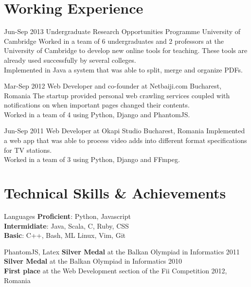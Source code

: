 \documentclass[]{friggeri-cv}
\begin{document}
\section{Working Experience}
\begin{entrylist}

  \entry
  {Jun-Sep 2013} 
  {}
  {Undergraduate Research Opportunities Programme}
  {University of Cambridge}
  {
    Worked in a team of 6 undergraduates and 2 professors at the University of Cambridge to develop new online tools
    for teaching.
    These tools are already used successfully by several colleges.\\

    Implemented in Java a system that was able to split, merge and organize PDFs.
  }

  \entry
  {Mar-Sep 2012}
  {}
  {Web Developer and co-founder at Netbaiji.com}
  {Bucharest, Romania}
  {
    The startup provided personal web crawling services coupled with notifications on when important pages changed
    their contents. \\  

    Worked in a team of 4 using Python, Django and PhantomJS.
  }

  \entry
  {Jun-Sep 2011}
  {}
  {Web Developer at Okapi Studio}
  {Bucharest, Romania}
  {
    Implemented a web app that was able to process video adds into different format specifications for TV stations. \\

    Worked in a team of 3 using Python, Django and FFmpeg.
  }

\end{entrylist}

\section{Technical Skills \& Achievements}
\begin{entrylist}
  \simpleentry
  {Languages}
  {
    \textbf{Proficient}:  Python, Javascript \\
    \textbf{Intermidiate}:  Java, Scala, C, Ruby, CSS \\
    \textbf{Basic}:  C++, Bash, ML
  }
   {
    Linux, Vim, Git
  }

   {
    PhantomJS, Latex
  }
   {
    \textbf{Silver Medal} at the Balkan Olympiad in Informatics 2011 \\
    \textbf{Silver Medal} at the Balkan Olympiad in Informatics 2010 \\
    \textbf{First place} at the Web Development section of the Fii Competition 2012, Romania
  }
\end{entrylist}
\end{document}
